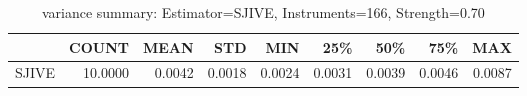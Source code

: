 \begin{table}[ht]
\centering
\caption{variance summary: Estimator=SJIVE, Instruments=166, Strength=0.70}
\begin{tabular}{lrrrrrrrr}
\toprule
 & COUNT & MEAN & STD & MIN & 25\% & 50\% & 75\% & MAX \\
\midrule
SJIVE & 10.0000 & 0.0042 & 0.0018 & 0.0024 & 0.0031 & 0.0039 & 0.0046 & 0.0087 \\
\bottomrule
\end{tabular}
\end{table}
